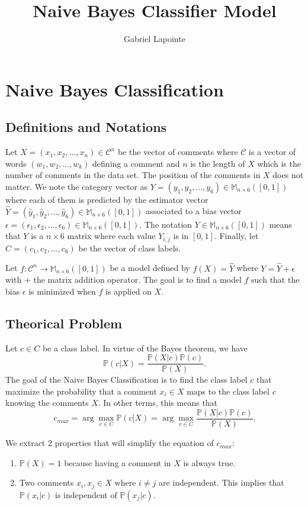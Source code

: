 \documentclass{article}
\title{Naive Bayes Classifier Model}
\author{Gabriel Lapointe}
\begin{document}
\section{Naive Bayes Classification}

\subsection{Definitions and Notations}
Let $X = (x_1,x_2,\ldots,x_n) \in \mathcal{C}^n$ be the vector of comments where $\mathcal{C}$ is a vector of words $(w_1, w_2, \ldots, w_k)$ defining a comment and $n$ is the length of $X$ which is the number of comments in the data set. The position of the comments in $X$ does not matter.
We note the category vector as $Y = (y_1,y_2,\ldots,y_6) \in \mathbb{M}_{n \times 6}([0,1])$ where each of them is predicted by the estimator vector $\hat{Y} = (\hat{y}_1,\hat{y}_2,\ldots,\hat{y}_6) \in \mathbb{M}_{n \times 6}([0,1])$ associated to a bias vector $\epsilon = (\epsilon_1, \epsilon_2, \ldots, \epsilon_6) \in \mathbb{M}_{n \times 6}([0,1])$. The notation $Y \in \mathbb{M}_{n \times 6}([0,1])$ means that $Y$ is a $n \times 6$ matrix where each value $Y_{i,j}$ is in $[0,1]$. Finally, let $C = (c_1,c_2,\ldots, c_6)$ be the vector of class labels.

Let $f : \mathcal{C}^n \longrightarrow \mathbb{M}_{n \times 6}([0,1])$ be a model defined by $f(X) = \hat{Y}$ where $Y = \hat{Y} + \epsilon$ with $+$ the matrix addition operator.
The goal is to find a model $f$ such that the bias $\epsilon$ is minimized when $f$ is applied on $X$.

\subsection{Theorical Problem}
Let $c \in C$ be a class label. In virtue of the Bayes theorem, we have
$$\mathbb{P}(c | X) = \frac{\mathbb{P}(X | c)\mathbb{P}(c)}{\mathbb{P}(X)}.$$
The goal of the Naive Bayes Classification is to find the class label $c$ that maximize the probability that a comment $x_i \in X$ maps to the class label $c$ knowing the comments $X$.
In other terms, this means that
$$c_{max} = \arg\max_{c \in C} \mathbb{P}(c | X) = \arg\max_{c \in C} \frac{\mathbb{P}(X | c)\mathbb{P}(c)}{\mathbb{P}(X)}.$$

We extract 2 properties that will simplify the equation of $c_{max}$:
\begin{enumerate}
	\item $\mathbb{P}(X) = 1$ because having a comment in $X$ is always true.
	\item Two comments $x_i, x_j \in X$ where $i \neq j$ are independent. This implies that $\mathbb{P}(x_i | c)$ is independent of $\mathbb{P}(x_j | c)$.
\end{enumerate}
\end{document}
